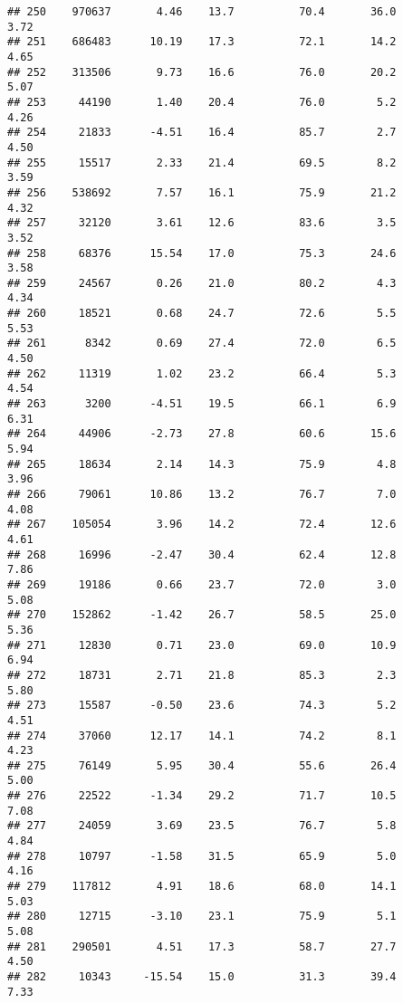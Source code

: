 \documentclass[
]{article}
\begin{document}
\begin{verbatim}
## 250    970637       4.46    13.7          70.4       36.0              3.72
## 251    686483      10.19    17.3          72.1       14.2              4.65
## 252    313506       9.73    16.6          76.0       20.2              5.07
## 253     44190       1.40    20.4          76.0        5.2              4.26
## 254     21833      -4.51    16.4          85.7        2.7              4.50
## 255     15517       2.33    21.4          69.5        8.2              3.59
## 256    538692       7.57    16.1          75.9       21.2              4.32
## 257     32120       3.61    12.6          83.6        3.5              3.52
## 258     68376      15.54    17.0          75.3       24.6              3.58
## 259     24567       0.26    21.0          80.2        4.3              4.34
## 260     18521       0.68    24.7          72.6        5.5              5.53
## 261      8342       0.69    27.4          72.0        6.5              4.50
## 262     11319       1.02    23.2          66.4        5.3              4.54
## 263      3200      -4.51    19.5          66.1        6.9              6.31
## 264     44906      -2.73    27.8          60.6       15.6              5.94
## 265     18634       2.14    14.3          75.9        4.8              3.96
## 266     79061      10.86    13.2          76.7        7.0              4.08
## 267    105054       3.96    14.2          72.4       12.6              4.61
## 268     16996      -2.47    30.4          62.4       12.8              7.86
## 269     19186       0.66    23.7          72.0        3.0              5.08
## 270    152862      -1.42    26.7          58.5       25.0              5.36
## 271     12830       0.71    23.0          69.0       10.9              6.94
## 272     18731       2.71    21.8          85.3        2.3              5.80
## 273     15587      -0.50    23.6          74.3        5.2              4.51
## 274     37060      12.17    14.1          74.2        8.1              4.23
## 275     76149       5.95    30.4          55.6       26.4              5.00
## 276     22522      -1.34    29.2          71.7       10.5              7.08
## 277     24059       3.69    23.5          76.7        5.8              4.84
## 278     10797      -1.58    31.5          65.9        5.0              4.16
## 279    117812       4.91    18.6          68.0       14.1              5.03
## 280     12715      -3.10    23.1          75.9        5.1              5.08
## 281    290501       4.51    17.3          58.7       27.7              4.50
## 282     10343     -15.54    15.0          31.3       39.4              7.33

\end{verbatim}
\end{document}

